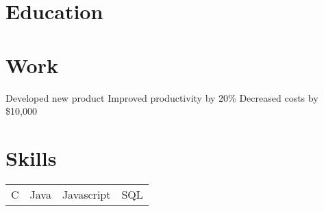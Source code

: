 \documentclass{my_cv}
\begin{document}
 

 
\section{Education}
 
\section{Work}
\workitems
{Developed new product}
{Improved productivity by 20\%}
{Decreased costs by \$10,000}

\section{Skills}

\begin{tabular}{l l l l}
    C & Java & Javascript & SQL \\
\end{tabular}
 
\end{document}
